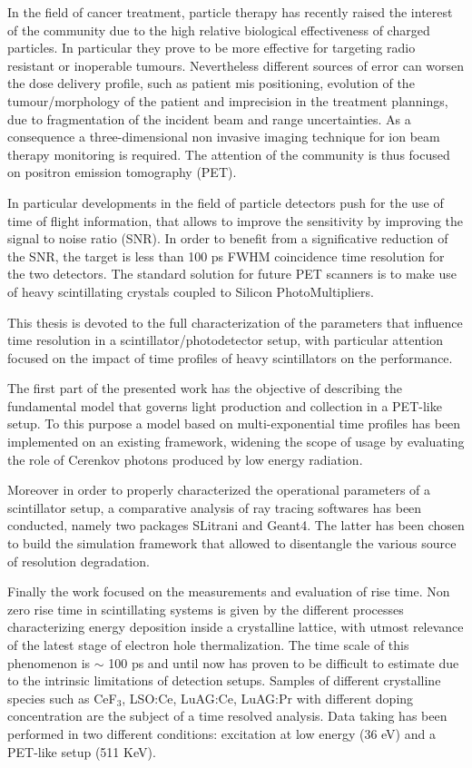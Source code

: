 \abstract

In the field of cancer treatment, particle therapy has recently raised the interest of the community due to the high relative biological effectiveness of charged particles.
In particular they prove to be more effective for targeting radio resistant or inoperable tumours.
Nevertheless different sources of error can worsen the dose delivery profile, such as patient mis positioning, evolution of the tumour/morphology of the patient and imprecision in the treatment plannings, due to fragmentation of the incident beam and range uncertainties.
As a consequence a three-dimensional non invasive imaging technique for ion beam therapy monitoring is required. The attention of the community is thus focused on positron emission tomography (PET).

In particular developments in the field of particle detectors push for the use of time of flight information, that allows to improve the sensitivity by improving the signal to noise ratio (SNR). 
In order to benefit from a significative reduction of the SNR, the target is less than 100 ps FWHM coincidence time resolution for the two detectors.
The standard solution for future PET scanners is to make use of heavy scintillating crystals coupled to Silicon PhotoMultipliers. 

This thesis is devoted to the full characterization of the parameters that influence time resolution in a scintillator/photodetector setup, with particular attention focused on the impact of time profiles of heavy scintillators on the performance.

The first part of the presented work has the objective of describing the fundamental model that governs light production and collection in a PET-like setup.
To this purpose a model based on multi-exponential time profiles has been implemented on an existing framework, widening the scope of usage by evaluating the role of Cerenkov photons produced by low energy radiation.

Moreover in order to properly characterized the operational parameters of a scintillator setup, a comparative analysis of ray tracing softwares has been conducted, namely two packages SLitrani and Geant4. The latter has been chosen to build the simulation framework that allowed to disentangle the various source of resolution degradation.

Finally the work focused on the measurements and evaluation of rise time. Non zero rise time in scintillating systems is given by the different processes characterizing energy deposition inside a crystalline lattice, with utmost relevance of the latest stage of electron hole thermalization. The time scale of this phenomenon is $\sim$ 100 ps and until now has proven to be difficult to estimate due to the intrinsic limitations of detection setups.
Samples of different crystalline species such as CeF$_{3}$, LSO:Ce, LuAG:Ce, LuAG:Pr with different doping concentration are the subject of a time resolved analysis. 
Data taking has been performed in two different conditions: excitation at low energy (36 eV) and a PET-like setup (511 KeV).

